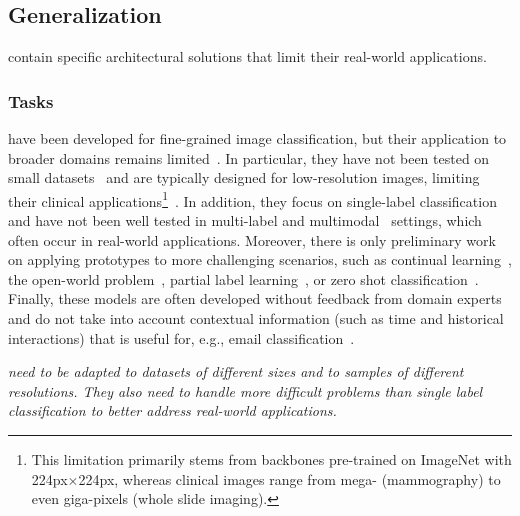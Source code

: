 
\subsection{\texorpdfstring{\colorbox[RGB]{255,145,77}{Generalization}}{Generalization}}
\label{ssec:chall:gen}

\ppms contain specific architectural solutions that limit their real-world applications.

\subsubsection{\texorpdfstring{\colorbox[RGB]{255,199,166}{Tasks}}{Tasks}}
\label{sssec:chall:gen:tasks}
\ppms have been developed for fine-grained image classification, but their application to broader domains remains limited~\citep{Xue_2024_ProtoPFormerConcentratingPrototypical}.
In particular, they have not been tested on small datasets~\citep{Song_2024_MorphologicalPrototypingUnsupervised} and are typically designed for low-resolution images, limiting their clinical applications\footnote{This limitation primarily stems from backbones pre-trained on ImageNet with 224px$\times$224px, whereas clinical images range from mega- (mammography) to even giga-pixels (whole slide imaging).}~\citep{Carmichael_2024_ThisProbablyLooks}.
In addition, they focus on single-label classification~\citep{Ruis_2021_IndependentPrototypePropagation} and have not been well tested in multi-label and multimodal~\citep{Rymarczyk_2023_ProtoMILMultipleInstance} settings, which often occur in real-world applications. Moreover, there is only preliminary work on applying prototypes to more challenging scenarios, such as continual learning~\citep{Rymarczyk_2023_ICICLEInterpretableClass}, the open-world problem~\citep{Zheng_2024_PrototypicalHash}, partial label learning~\citep{Carmichael_2024_ThisProbablyLooks}, or zero shot classification~\citep{Ruis_2021_IndependentPrototypePropagation}. Finally, these models are often developed without feedback from domain experts~\citep{Fauvel_2023_LightweightEfficientExplainablebyDesign} and do not take into account contextual information (such as time and historical interactions) that is useful for, e.g., email classification~\citep{Wang_2023_PROMINETPrototypebasedMultiView}.

\textit{\ppms need to be adapted to datasets of different sizes and to samples of different resolutions. They also need to handle more difficult problems than single label classification to better address real-world applications.}

